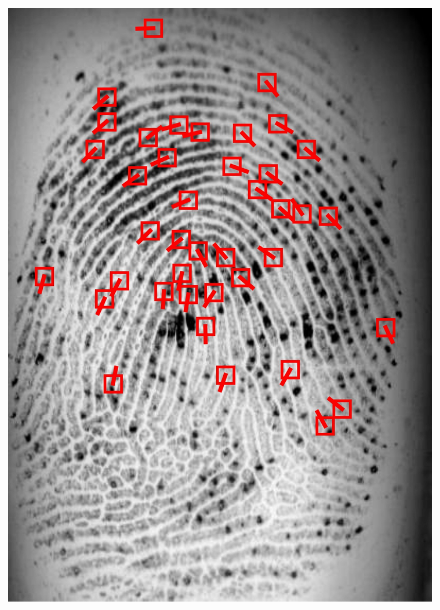 \begin{figure}[htbp]
    \includegraphics[width=\figwidth\linewidth]{fig/minutiaenet/3.jpg}

\end{figure}
